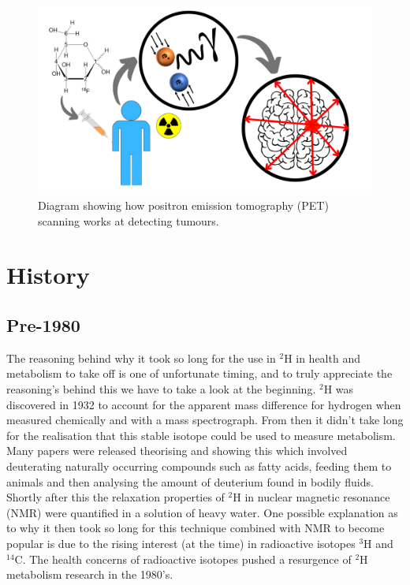 \documentclass[class=article, crop=false]{standalone}
\begin{document}
\begin{figure}
    \centering
    \includegraphics[width=1\textwidth]{Figures/Intro/PET_Scan.png}
    \caption{Diagram showing how positron emission tomography (PET) scanning works at detecting tumours.}
    \label{fig:intro:PET}
\end{figure}

\section{History}

\subsection{Pre-1980}

The reasoning behind why it took so long for the use in $^2$H in health and metabolism to take off is one of unfortunate timing, and to truly appreciate the reasoning's behind this we have to take a look at the beginning. $^2$H was discovered in 1932\cite{Urey1932AConcentration} to account for the apparent mass difference for hydrogen when measured chemically and with a mass spectrograph. From then it didn't take long for the realisation that this stable isotope could be used to measure metabolism. Many papers were released theorising and showing this\cite{Schoenheimer1935DeuteriumMetabolism,Schoenheimer1935DeuteriumMetabolismb,Schoenheimer1938TheMetabolism} which involved deuterating naturally occurring compounds such as fatty acids, feeding them to animals and then analysing the amount of deuterium found in bodily fluids. Shortly after this the relaxation properties of $^2$H in nuclear magnetic resonance (NMR) were quantified in a solution of heavy water\cite{Bloembergen1948RelaxationAbsorption}. One possible explanation as to why it then took so long for this technique combined with NMR to become popular is due to the rising interest (at the time)\cite{DeFeyter2021DeuteriumFuture} in radioactive isotopes $^3$H\cite{Thompson1953StudiesRat} and $^{14}$C\cite{Turteltaub1990AcceleratorDNA.}. The health concerns of radioactive isotopes pushed a resurgence of $^2$H metabolism research in the 1980's.
\end{document}
